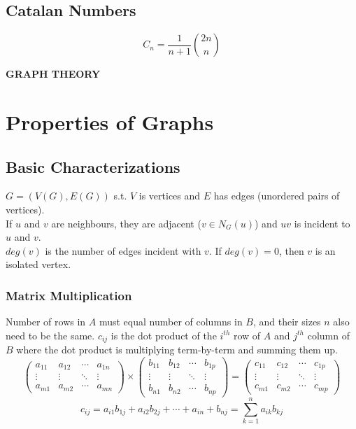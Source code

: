 \documentclass[11pt]{article}
\newcommand{\nl}{\\[5pt]}
\begin{document}
\subsection{Catalan Numbers}
$$C_n = \frac{1}{n+1}\binom{2n}{n}$$

\newpage
\begin{center}{\textbf{\Large{GRAPH THEORY}}}\end{center}
\vspace{-20pt}
\section{Properties of Graphs}
\subsection{Basic Characterizations}
$G = (V(G), E(G))$ s.t. $V$ is vertices and $E$ has edges (unordered pairs of vertices). \nl
If $u$ and $v$ are neighbours, they are adjacent ($v \in N_G(u)$) and $uv$ is incident to $u$ and $v$. \nl 
$deg(v)$ is the number of edges incident with $v$. If $deg(v) = 0$, then $v$ is an isolated vertex. 

\subsubsection{Matrix Multiplication}
Number of rows in $A$ must equal number of columns in $B$, and their sizes $n$ also need to be the same. $c_{ij}$ is the dot product of the $i^{th}$ row of $A$ and $j^{th}$ column of $B$ where the dot product is multiplying term-by-term and summing them up. 
 $$
     \begin{pmatrix}
         a_{11} & a_{12} & \cdots & a_{1n}\\
         \vdots & \vdots & \ddots & \vdots\\ 
         a_{m1} & a_{m2} & \cdots & a_{mn} 
     \end{pmatrix}
     \times
     \begin{pmatrix}
         b_{11} & b_{12} & \cdots & b_{1p}\\
         \vdots & \vdots & \ddots & \vdots\\ 
         b_{n1} & b_{n2} & \cdots & b_{np} 
     \end{pmatrix}
      =
     \begin{pmatrix}
         c_{11} & c_{12} & \cdots & c_{1p}\\
         \vdots & \vdots & \ddots & \vdots\\ 
         c_{m1} & c_{m2} & \cdots & c_{mp} 
     \end{pmatrix}$$
 $$c_{ij}= a_{i1} b_{1j} + a_{i2} b_{2j} +\cdots+ a_{in} + b_{nj} = \sum_{k=1}^n a_{ik}b_{kj}$$
\end{document}
